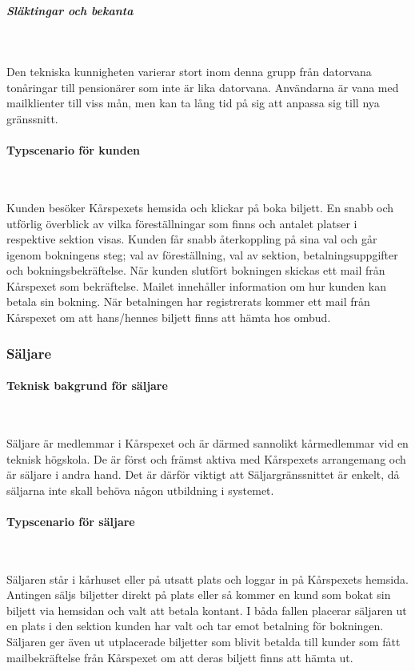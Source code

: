 \documentclass[a4paper, twoside, 11pt, titlepage]{article}
\begin{document}
			\subparagraph{\emph{Släktingar och bekanta}}\

				Den tekniska kunnigheten varierar stort inom denna grupp från datorvana tonåringar till pensionärer som inte är lika datorvana. Användarna är vana med mailklienter till viss mån, men kan ta lång tid på sig att anpassa sig till nya gränssnitt.

			\paragraph{Typscenario för kunden}\

			Kunden besöker Kårspexets hemsida och klickar på boka biljett. En snabb och utförlig överblick av vilka föreställningar som finns och antalet platser i respektive sektion visas. Kunden får snabb återkoppling på sina val och går igenom bokningens steg; val av föreställning, val av sektion, betalningsuppgifter och bokningsbekräftelse. När kunden slutfört bokningen skickas ett mail från Kårspexet som bekräftelse. Mailet innehåller information om hur kunden kan betala sin bokning. När betalningen har registrerats kommer ett mail från Kårspexet om att hans/hennes biljett finns att hämta hos ombud.

		\subsubsection{Säljare}



			\paragraph{Teknisk bakgrund för säljare}\

			Säljare är medlemmar i Kårspexet och är därmed sannolikt kårmedlemmar vid en teknisk högskola. De är först och främst aktiva med Kårspexets arrangemang och är säljare i andra hand. Det är därför viktigt att Säljargränssnittet är enkelt, då säljarna inte skall behöva någon utbildning i systemet.

			\paragraph{Typscenario för säljare}\

			Säljaren står i kårhuset eller på utsatt plats och loggar in på Kårspexets hemsida. Antingen säljs biljetter direkt på plats eller så kommer en kund som bokat sin biljett via hemsidan och valt att betala kontant. I båda fallen placerar säljaren ut en plats i den sektion kunden har valt och tar emot betalning för bokningen. Säljaren ger även ut utplacerade biljetter som blivit betalda till kunder som fått mailbekräftelse från Kårspexet om att deras biljett finns att hämta ut.
\end{document}
